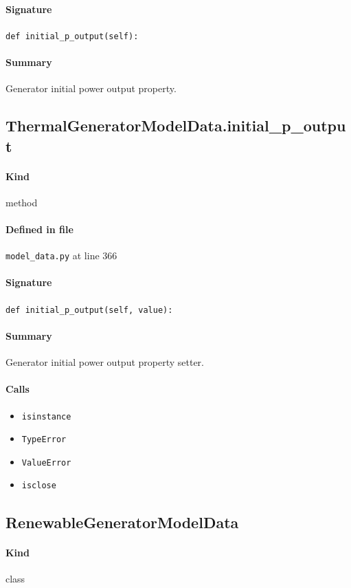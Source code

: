 \documentclass[11pt]{report}
\begin{document}
\paragraph{Signature} \texttt{def initial\_p\_output(self):}
\paragraph{Summary} Generator initial power output property.
\subsection{ThermalGeneratorModelData.initial\_p\_output}
\label{def:model_data.py:ThermalGeneratorModelData.initial_p_output:L366}
\paragraph{Kind} method
\paragraph{Defined in file} \texttt{model\_data.py} at line 366
\paragraph{Signature} \texttt{def initial\_p\_output(self, value):}
\paragraph{Summary} Generator initial power output property setter.
\paragraph{Calls}
\begin{itemize}[leftmargin=*]
  \item \texttt{isinstance}
  \item \texttt{TypeError}
  \item \texttt{ValueError}
  \item \texttt{isclose}
\end{itemize}
\subsection{RenewableGeneratorModelData}
\label{def:model_data.py:RenewableGeneratorModelData:L391}
\paragraph{Kind} class
\end{document}
